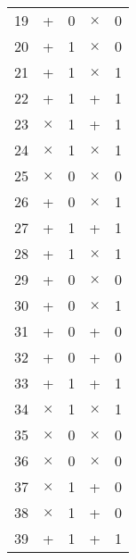 \begin{longtable}{c|cc|cc}
    19     & +                          & 0                       & $\times$ & 0   \\
    20     & +                          & 1                       & $\times$ & 0   \\
    21     & +                          & 1                       & $\times$ & 1   \\
    22     & +                          & 1                       & +        & 1   \\
    23     & $\times$                   & 1                       & +        & 1   \\
    24     & $\times$                   & 1                       & $\times$ & 1   \\
    25     & $\times$                   & 0                       & $\times$ & 0   \\
    26     & +                          & 0                       & $\times$ & 1   \\
    27     & +                          & 1                       & +        & 1   \\
    28     & +                          & 1                       & $\times$ & 1   \\
    29     & +                          & 0                       & $\times$ & 0   \\
    30     & +                          & 0                       & $\times$ & 1   \\
    31     & +                          & 0                       & +        & 0   \\
    32     & +                          & 0                       & +        & 0   \\
    33     & +                          & 1                       & +        & 1   \\
    34     & $\times$                   & 1                       & $\times$ & 1   \\
    35     & $\times$                   & 0                       & $\times$ & 0   \\
    36     & $\times$                   & 0                       & $\times$ & 0   \\
    37     & $\times$                   & 1                       & +        & 0   \\
    38     & $\times$                   & 1                       & +        & 0   \\
    39     & +                          & 1                       & +        & 1   \\

\end{longtable}
